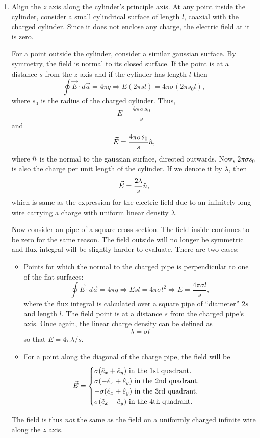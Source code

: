 \documentclass{article}
\begin{document}
\begin{enumerate}
\item Align the $z$ axis along the cylinder's principle axis. At any point inside
the cylinder, consider a small cylindrical surface of length $l$, coaxial
with the charged cylinder. Since it does not enclose any charge, the electric
field at it is zero. 

For a point outside the cylinder, consider a similar gaussian surface. By symmetry,
the field is normal to its closed surface. If the point is at a distance $s$ from
the $z$ axis and if the cylinder has length $l$ then
\[
\oint\vec{E}\cdot d\vec{a} = 4\pi q \Rightarrow E(2\pi sl) = 4\pi\sigma(2\pi s_0l),
\]
where $s_0$ is the radius of the charged cylinder. Thus,
\[
E = \frac{4\pi\sigma s_0}{s}
\]
and
\[
\vec{E} = \frac{4\pi\sigma s_0}{s}\hat{n},
\]
where $\hat{n}$ is the normal to the gaussian surface, directed outwards. Now, $2\pi
\sigma s_0$ is also the charge per unit length of the cylinder. If we denote it 
by $\lambda$, then
\[
\vec{E} = \frac{2\lambda}{s}\hat{n},
\]
which is same as the expression for the electric field due to an infinitely long
wire carrying a charge with uniform linear density $\lambda$.

Now consider an pipe of a square cross section. The field inside continues to be
zero for the same reason. The field outside will no longer be symmetric and flux
integral will be slightly harder to evaluate. There are two cases:
\begin{itemize}
\item Points for which the normal to the charged pipe is perpendicular to one of
the flat surfaces:
\[
\oint\vec{E}\cdot d\vec{a} = 4\pi q \Rightarrow Esl = 4\pi\sigma l^2 \Rightarrow
E = \frac{4\pi\sigma l}{s},
\]
where the flux integral is calculated over a square pipe of ``diameter'' $2s$ and
length $l$. The field point is at a distance $s$ from the charged pipe's axis. 
Once again, the linear charge density can be defined as 
\[
\lambda = \sigma l
\]
so that $E = 4\pi\lambda/s$. 

\item For a point along the diagonal of the charge pipe, the field will be
\[
\vec{E} = \begin{cases}
\sigma(\hat{e}_{x} + \hat{e}_{y}) \text{ in the 1st quadrant.} \\
\sigma(-\hat{e}_{x} + \hat{e}_{y}) \text{ in the 2nd quadrant.} \\
-\sigma(\hat{e}_{x} + \hat{e}_{y}) \text{ in the 3rd quadrant.} \\
\sigma(\hat{e}_{x} - \hat{e}_{y}) \text{ in the 4th quadrant.}
\end{cases}
\]
\end{itemize}
The field is thus \emph{not} the same as the field on a uniformly charged infinite
wire along the $z$ axis.


\end{enumerate}
\end{document}
